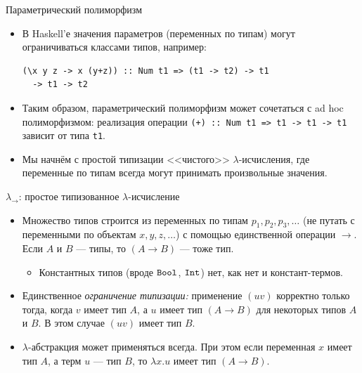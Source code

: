 \documentclass[xcolor=dvipsnames]{beamer}
\newcommand{\Int}{\mbox{\texttt{Int}}}
\newcommand{\Bool}{\mbox{\texttt{Bool}}}
\begin{document}
\begin{frame}[fragile]{Параметрический полиморфизм}

\begin{itemize}[<+->]
 \item В Haskell'е значения параметров (переменных по типам) могут ограничиваться классами типов, например:
 \begin{verbatim}
(\x y z -> x (y+z)) :: Num t1 => (t1 -> t2) -> t1 
  -> t1 -> t2
 \end{verbatim}
\item Таким образом, параметрический полиморфизм может сочетаться с ad hoc полиморфизмом: реализация операции 
\texttt{(+) :: Num t1 => t1 -> t1 -> t1} зависит от типа \texttt{t1}.
\item Мы начнём с простой типизации <<чистого>> $\lambda$-исчисления, где переменные по типам всегда могут принимать произвольные значения.
\end{itemize}

 
\end{frame}


\begin{frame}{$\lambda_\to$: простое типизованное $\lambda$-исчисление}
 
 \begin{itemize}[<+->]
  \item Множество типов строится из переменных по типам $p_1, p_2, p_3, \ldots$ (не путать с переменными по объектам $x,y,z,\ldots$) с помощью единственной операции $\to$. Если $A$ и $B$ --- типы, то $(A \to B)$ --- тоже тип.
  \begin{itemize}
  \item Константных типов (вроде $\Bool$, $\Int$) нет, как нет и констант-термов.
  \end{itemize}
  
  \item Единственное {\em ограничение типизации:} применение $(uv)$ корректно только тогда, когда $v$ имеет тип $A$, а $u$ имеет тип $(A \to B)$ для некоторых типов $A$ и $B$.
  В этом случае $(uv)$ имеет тип $B$.
  
  \item $\lambda$-абстракция может применяться всегда. При этом если переменная $x$ имеет тип $A$, а терм $u$ --- тип $B$, то $\lambda x. u$ имеет тип $(A \to B)$.
 \end{itemize}

                                                     
\end{frame}
\end{document}
